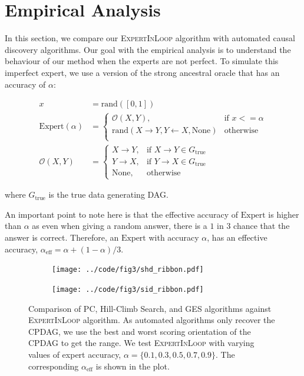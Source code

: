 \documentclass{uai2025} %
\begin{document}
\section{Empirical Analysis}
\label{sec:empirical}

In this section, we compare our \textsc{ExpertInLoop} algorithm with automated
causal discovery algorithms. Our goal with the empirical analysis is to
understand the behaviour of our method when the experts are not perfect. To
simulate this imperfect expert, we use a version of the strong ancestral oracle
that has an accuracy of $ \alpha $:

\begin{equation}
	\begin{split}
		x &= \textrm{rand}([0, 1]) \\
		\mathrm{Expert}(\alpha) &= \begin{cases} 
			\mathcal{O}(X, Y),  & \textrm{if  } x <= \alpha \\
			\textrm{rand}(X \rightarrow Y, Y \leftarrow X, \textrm{None}) & \textrm{otherwise} \\
				\end{cases} \\
			\mathcal{O}(X, Y) &= \begin{cases}
				X \rightarrow Y, & \textrm{if } X \rightarrow Y \in G_{\textrm{true}} \\
				Y \rightarrow X, & \textrm{if } Y \rightarrow X \in G_{\textrm{true}} \\
					\textrm{None}, & \textrm{otherwise }
				  \end{cases}
	\end{split}
\end{equation}

where $G_{\textrm{true}}$ is the true data generating DAG.

An important point to note here is that the effective accuracy of $
\mathrm{Expert} $ is higher than $ \alpha $ as even when giving a random
answer, there is a $ 1 $ in $ 3 $ chance that the answer is correct. Therefore,
an $ \mathrm{Expert} $ with accuracy $ \alpha $, has an effective accuracy, $ \alpha_{\mathrm{eff}} = \alpha + (1 - \alpha) / 3 $.

\begin{figure}[t!]
	\centering
	\begin{subfigure}{0.5\textwidth}
		\centering
		\texttt{[image: ../code/fig3/shd\_ribbon.pdf]}
		\caption{}
	\end{subfigure}
	\begin{subfigure}{0.5\textwidth}
		\centering
		\texttt{[image: ../code/fig3/sid\_ribbon.pdf]}
		\caption{}
	\end{subfigure}
	\caption{Comparison of PC, Hill-Climb Search, and GES algorithms against
		\textsc{ExpertInLoop} algorithm. As automated algorithms only
		recover the CPDAG, we use the best and worst scoring
		orientation of the CPDAG to get the range. We test
		\textsc{ExpertInLoop} with varying values of expert accuracy, $ \alpha = \{0.1, 0.3, 0.5, 0.7, 0.9\} $. The corresponding
		$\alpha_{\textrm{eff}} $ is shown in the plot.}
	\label{fig:shd_sid}
\end{figure}
\end{document}

